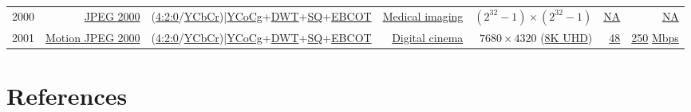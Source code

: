 \begin{tabular}{lrrrrrr}
2000 & %
\href{https://en.wikipedia.org/wiki/JPEG_2000}{JPEG 2000} & %
(\href{https://en.wikipedia.org/wiki/Chroma_subsampling#4:2:0}{4:2:0}/\href{https://en.wikipedia.org/wiki/JPEG#Color_space_transformation}{YCbCr})|\href{https://en.wikipedia.org/wiki/YCoCg}{YCoCg}+\href{https://en.wikipedia.org/wiki/Discrete_wavelet_transform}{DWT}+\href{https://en.wikipedia.org/wiki/Quantization_(signal_processing)}{SQ}+\href{https://ijcsi.org/papers/IJCSI-8-4-1-531-536.pdf}{EBCOT} & %
\href{https://en.wikipedia.org/wiki/Medical_imaging}{Medical imaging} & %
$(2^{32}-1)\times (2^{32}-1)$ & %
\href{https://en.wikipedia.org/wiki/N/A}{NA} & %
\href{https://en.wikipedia.org/wiki/N/A}{NA} \\ %

2001 & %
\href{https://en.wikipedia.org/wiki/Motion_JPEG_2000}{Motion JPEG 2000} & %
(\href{https://en.wikipedia.org/wiki/Chroma_subsampling#4:2:0}{4:2:0}/\href{https://en.wikipedia.org/wiki/JPEG#Color_space_transformation}{YCbCr})|\href{https://en.wikipedia.org/wiki/YCoCg}{YCoCg}+\href{https://en.wikipedia.org/wiki/Discrete_wavelet_transform}{DWT}+\href{https://en.wikipedia.org/wiki/Quantization_(signal_processing)}{SQ}+\href{https://ijcsi.org/papers/IJCSI-8-4-1-531-536.pdf}{EBCOT} & %
\href{https://en.wikipedia.org/wiki/Digital_cinema}{Digital cinema} & %
\href{https://en.wikipedia.org/wiki/Digital_cinema}{$7680\times 4320$} (\href{https://en.wikipedia.org/wiki/8K_resolution}{8K UHD}) & %
\href{https://en.wikipedia.org/wiki/Digital_cinema}{48} & %
\href{https://en.wikipedia.org/wiki/Digital_Cinema_Package}{250} \href{https://en.wikipedia.org/wiki/Data-rate_units}{Mbps} \\ %

\end{tabular}

\section{References}

\renewcommand{\addcontentsline}[3]{}%


